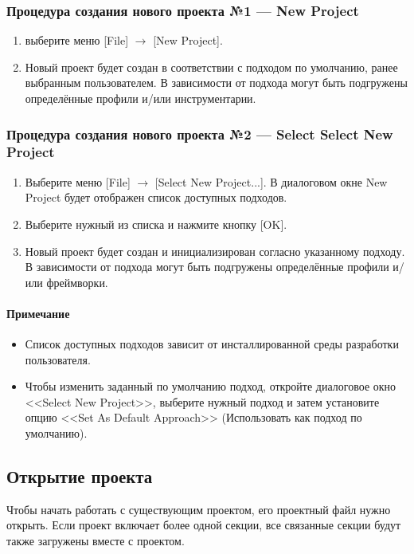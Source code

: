 \documentclass[a4paper,12pt]{extreport}
\begin{document}
\subsubsection*{Процедура создания нового проекта №1 --- New Project}
\begin{enumerate}
	\item выберите меню [File] $\to$ [New Project].
	\item Новый проект будет создан в соответствии с подходом по умолчанию, ранее выбранным
	пользователем. В зависимости от подхода могут быть подгружены определённые профили
	и/или инструментарии.
\end{enumerate}
 
\subsubsection*{Процедура создания нового проекта №2 --- Select Select New Project}
\begin{enumerate}
	\item Выберите меню [File] $\to$ [Select New Project...]. В	диалоговом окне New Project будет отображен список доступных подходов.
	\item Выберите	нужный из списка и нажмите кнопку [OK].
	\item Новый проект будет создан и инициализирован согласно указанному подходу. В
	зависимости от подхода могут быть подгружены определённые профили и/или фреймворки.
\end{enumerate}

\paragraph{Примечание}
\begin{itemize}
	\item Список доступных подходов зависит от инсталлированной среды разработки пользователя.
	\item Чтобы изменить заданный по умолчанию подход, откройте диалоговое окно <<Select New
	Project>>, выберите нужный подход и затем установите опцию <<Set As Default Approach>>
	(Использовать как подход по умолчанию).
\end{itemize}

\subsection*{Открытие проекта}
Чтобы начать работать с существующим проектом, его проектный файл нужно открыть. Если
проект включает более одной секции, все связанные секции будут также загружены вместе с
проектом.
\end{document}
